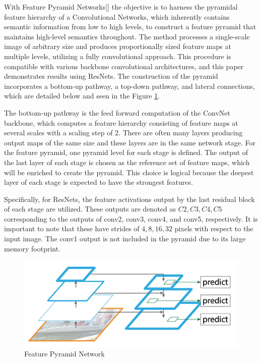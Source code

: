 With Feature Pyramid Networks[] the objective is to harness the pyramidal feature hierarchy of a Convolutional Networks, which inherently contains semantic 
information from low to high levels, to construct a feature pyramid that maintains high-level semantics throughout. The method processes a single-scale 
image of arbitrary size and produces proportionally sized feature maps at multiple levels, utilizing a fully convolutional approach. This procedure is 
compatible with various backbone convolutional architectures, and this paper demonstrates results using ResNets. The construction of the pyramid incorporates 
a bottom-up pathway, a top-down pathway, and lateral connections, which are detailed below and seen in the Figure \ref{fig:fpn}.

The bottom-up pathway is the feed forward computation of the ConvNet backbone, which computes a feature hierarchy consisting of feature maps at several scales 
with a scaling step of 2. There are often many layers producing output maps of the same size and these layers are in the same network stage. For the 
feature pyramid, one pyramid level for each stage is defined. The output of the last layer of each stage is chosen as the reference set of feature maps, 
which will be enriched to create the pyramid. This choice is logical because the deepest layer of each stage is expected to have the strongest features.

Specifically, for ResNets, the feature activations output by the last residual block of each stage are utilized. These outputs are denoted as ${C2, C3, C4, C5}$ 
corresponding to the outputs of conv2, conv3, conv4, and conv5, respectively. It is important to note that these have strides of ${4, 8, 16, 32}$ pixels with 
respect to the input image. The conv1 output is not included in the pyramid due to its large memory footprint.

\begin{figure}[h!]
    \centering
    \includegraphics[scale=0.5]{Figures/fpn-base.png}
    \caption{Feature Pyramid Network}
    \label{fig:fpn}
\end{figure}

